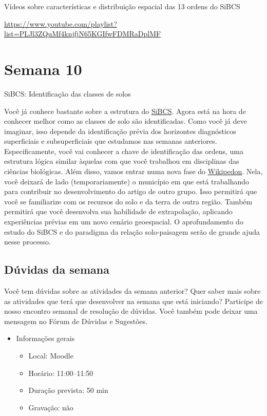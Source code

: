 \documentclass[
  11pt,
  a4paper,
  dvipsnames]{tufte-book}
\providecommand{\tightlist}{%
  \setlength{\itemsep}{0pt}\setlength{\parskip}{0pt}}
\begin{document}
Vídeos sobre características e distribuição espacial das 13 ordens do SiBCS

\url{https://www.youtube.com/playlist?list=PLJl3ZQuMf4knjfjN65KGIfwFDMRaDplMF}

\hypertarget{semana-10}{%
\chapter{Semana 10}\label{semana-10}}

SiBCS: Identificação das classes de solos

Você já conhece bastante sobre a estrutura do \href{https://www.embrapa.br/en/solos/sibcs}{SiBCS}. Agora está na hora de conhecer melhor como as classes de solo são identificadas. Como você já deve imaginar, isso depende da identificação prévia dos horizontes diagnósticos superficiais e subsuperficiais que estudamos nas semanas anteriores. Especificamente, você vai conhecer a chave de identificação das ordens, uma estrutura lógica similar àquelas com que você trabalhou em disciplinas das ciências biológicas. Além disso, vamos entrar numa nova fase do \href{https://pt.wikiversity.org/wiki/Wikipedon}{Wikipedon}. Nela, você deixará de lado (temporariamente) o município em que está trabalhando para contribuir no desenvolvimento do artigo de outro grupo. Isso permitirá que você se familiarize com os recursos do solo e da terra de outra região. Também permitirá que você desenvolva sua habilidade de extrapolação, aplicando experiências prévias em um novo cenário geoespacial. O aprofundamento do estudo do SiBCS e do paradigma da relação solo-paisagem serão de grande ajuda nesse processo.

\hypertarget{duxfavidas-da-semana-8}{%
\section{Dúvidas da semana}\label{duxfavidas-da-semana-8}}

Você tem dúvidas sobre as atividades da semana anterior? Quer saber mais sobre as atividades que terá que desenvolver na semana que está iniciando? Participe de nosso encontro semanal de resolução de dúvidas. Você também pode deixar uma mensagem no Fórum de Dúvidas e Sugestões.

\begin{itemize}
\tightlist
\item
  Informações gerais

  \begin{itemize}
  \tightlist
  \item
    Local: Moodle
  \item
    Horário: 11:00--11:50
  \item
    Duração prevista: 50 min
  \item
    Gravação: não
  \end{itemize}
\end{itemize}
\end{document}
